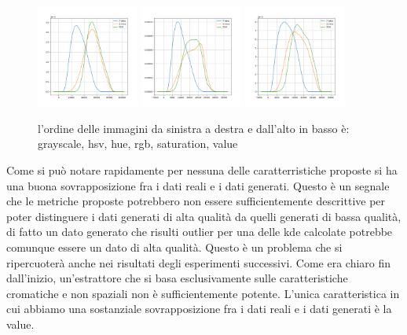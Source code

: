 \begin{figure}[!ht]
    \centering
    \includegraphics[width=0.3\textwidth]{../images/realworldexperiments/butterflies/kde/kde_rgb_histogram.png}
    \includegraphics[width=0.3\textwidth]{../images/realworldexperiments/butterflies/kde/kde_saturation_histogram.png}
    \includegraphics[width=0.3\textwidth]{../images/realworldexperiments/butterflies/kde/kde_value_histogram.png}
    \caption{l'ordine delle immagini da sinistra a destra e dall'alto in basso è: grayscale, hsv, hue, rgb, saturation, value}
\end{figure}

Come si può notare rapidamente per nessuna delle caratterristiche proposte si ha una buona sovrapposizione fra i dati reali e i dati generati. Questo è un segnale che le metriche proposte potrebbero non essere sufficientemente descrittive per poter distinguere i dati generati di alta qualità da quelli generati di bassa qualità,
di fatto un dato generato che risulti outlier per una delle kde calcolate potrebbe comunque essere un dato di alta qualità. Questo è un problema che si ripercuoterà anche nei risultati degli esperimenti successivi.
Come era chiaro fin dall'inizio, un'estrattore che si basa esclusivamente sulle caratteristiche cromatiche e non spaziali non è sufficientemente potente.
L'unica caratteristica in cui abbiamo una sostanziale sovrapposizione fra i dati reali e i dati generati è la value.

